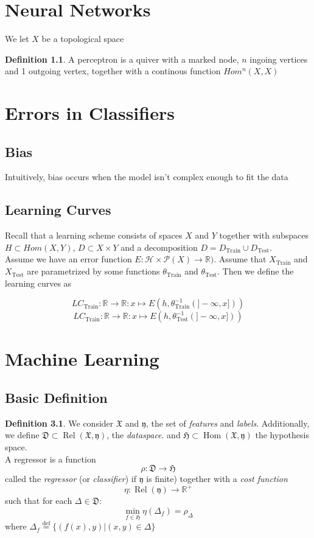 \documentclass{book}
\theoremstyle{plain}
\theoremstyle{definition}
\newtheorem{definition}[corollary]{Definition}
\renewcommand{\d}[1]{\mathbb{#1}}
\newcommand{\define}{\stackrel{\operatorname{def}}{=}}
\newcommand{\f}[1]{\mathfrak{#1}}
\newcommand{\fun}{\mapsto}
\DeclareMathOperator{\Hom}{Hom}
\newcommand{\mor}{\longrightarrow}
\DeclareMathOperator{\Rel}{Rel}
\renewcommand{\r}[1]{\mathcal{#1}}
\DeclareMathOperator{\Test}{Test}
\DeclareMathOperator{\Train}{Train}
\renewcommand{\r}[1]{\mathcal{#1}}
\begin{document}
\chapter{Neural Networks}
We let $X$ be a topological space
\begin{definition}
A perceptron is a quiver with a marked node, $n$ ingoing	 vertices and 1 outgoing vertex, together with a continous function $Hom^{n}(X,X)$
\end{definition}

\chapter{Errors in Classifiers}


\section{Bias}

Intuitively, bias occurs when the model isn't complex enough to fit the data




\section{Learning Curves}
Recall that a learning scheme consists of spaces $X$ and $Y$ together with subspaces $H\subset Hom(X,Y)$, $D\subset X\times Y$ and a decomposition $D=D_{\Train}\cup D_{\Test}$.\\
Assume we have an error function $E:\r{H}\times \r{P}(X)\mor \d{R})$. Assume that $X_{\Train}$ and $X_{\Test}$ are parametrized by some functions $\theta_{\Train}$ and $\theta_{\Test}$. Then we define the learning curves as

\[
LC_{\Train}:\d{R}\mor \d{R}: x\fun E(h,\theta_{\Train}^{-1}(]-\infty,x]))
\]
\[
LC_{\Train}:\d{R}\mor \d{R}: x\fun E(h,\theta_{\Test}^{-1}(]-\infty,x]))\]






\chapter{Machine Learning}

\section{Basic Definition}

\begin{definition}
We consider $\f{X}$ and $\f{y}$, the set of \emph{features} and \emph{labels}. Additionally, we define $\f{D}\subset \Rel(\f{X},\f{y})$, the \emph{dataspace}. and $\f{H}\subset \Hom (\f{X},\f{y})$ the hypothesis space.\\ A regressor is a function
\[
\rho: \f{D}\mor \f{H}
\]
called the \emph{regressor} (or \emph{classifier}) if $\f{y}$ is finite)
together with a \emph{cost function }
\[
\eta: \Rel(\f{y})\mor \d{R}^+
\]
such that for each $\Delta \in \f{D}$:
\[
\min_{f\in \f{H}} \eta(\Delta_f)=\rho_\Delta
\]
where $\Delta_f \define\{(f(x),y)\vert (x,y) \in \Delta \}$
\end{definition}
\end{document}
